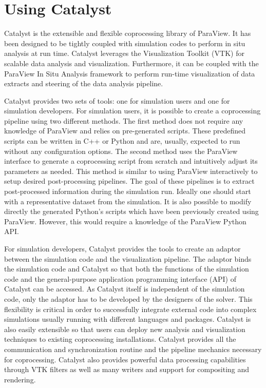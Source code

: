 \section{Using Catalyst}
\label{sec:catalyst}

Catalyst is the extensible and flexible coprocessing library of ParaView. 
It has been designed to be tightly coupled with simulation codes to perform in situ analysis at run time. 
Catalyst leverages the Visualization Toolkit (VTK) for scalable data analysis and visualization. Furthermore, it can be coupled with the ParaView In Situ Analysis framework to perform run-time visualization of data extracts and steering of the data analysis pipeline.

Catalyst provides two sets of tools: one for simulation users and one for simulation developers.
For simulation users, it is possible to create a coprocessing pipeline using two different methods. 
The first method does not require any knowledge of ParaView and relies on pre-generated scripts. These predefined scripts can be written in C++ or Python and are, usually, expected to run without any configuration options. 
The second method uses the ParaView interface to generate a coprocessing script from scratch and intuitively adjust its parameters as needed. This method is similar to using ParaView interactively to setup desired post-processing pipelines. The goal of these pipelines is to extract post-processed information during the simulation run. Ideally one should start with a representative dataset from the simulation. It is also possible to modify directly the generated Python's scripts which have been previously created using ParaView. However, this would require a knowledge of the ParaView Python API.

For simulation developers, Catalyst provides the tools to create an adaptor between the simulation code and the visualization pipeline.
The adaptor binds the simulation code and Catalyst so that both the functions of the simulation code and the general-purpose application programming interface (API) of Catalyst can be accessed. As Catalyst itself is independent of the simulation code, only the adaptor has to be developed by the designers of the solver. This flexibility is critical in order to successfully integrate external code into complex simulations usually running with different languages and packages. Catalyst is also easily extensible so that users can deploy new analysis and visualization techniques to existing coprocessing installations. Catalyst provides all the communication and synchronization routine and the pipeline mechanics necessary for coprocessing. Catalyst also provides powerful data processing capabilities through VTK filters as well as many writers and support for compositing and rendering.

